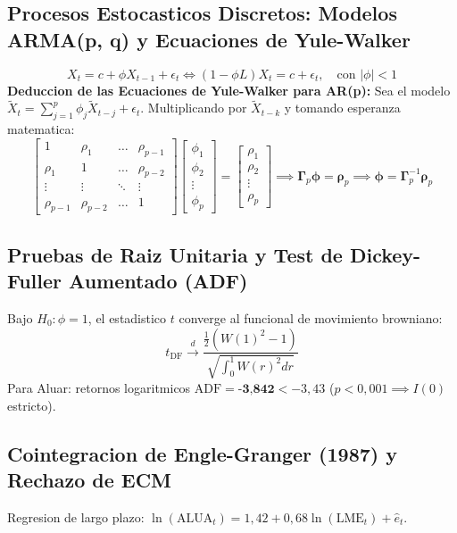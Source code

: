 \documentclass[10pt,a4paper]{article}
\theoremstyle{definition}
\begin{document}
\subsection{Procesos Estocasticos Discretos: Modelos ARMA(p, q) y Ecuaciones de Yule-Walker}
\begin{equation}
X_t = c + \phi X_{t-1} + \epsilon_t \iff (1 - \phi L)X_t = c + \epsilon_t, \quad \text{con } |\phi| < 1
\end{equation}
\textbf{Deduccion de las Ecuaciones de Yule-Walker para AR(p):}
Sea el modelo $\tilde{X}_t = \sum_{j=1}^p \phi_j \tilde{X}_{t-j} + \epsilon_t$. Multiplicando por $\tilde{X}_{t-k}$ y tomando esperanza matematica:
\begin{equation}
\begin{bmatrix}
1 & \rho_1 & \dots & \rho_{p-1} \\
\rho_1 & 1 & \dots & \rho_{p-2} \\
\vdots & \vdots & \ddots & \vdots \\
\rho_{p-1} & \rho_{p-2} & \dots & 1
\end{bmatrix}
\begin{bmatrix}
\phi_1 \\
\phi_2 \\
\vdots \\
\phi_p
\end{bmatrix}
=
\begin{bmatrix}
\rho_1 \\
\rho_2 \\
\vdots \\
\rho_p
\end{bmatrix}
\implies \boldsymbol{\Gamma}_p \boldsymbol{\phi} = \boldsymbol{\rho}_p \implies \boldsymbol{\phi} = \boldsymbol{\Gamma}_p^{-1} \boldsymbol{\rho}_p
\end{equation}

\subsection{Pruebas de Raiz Unitaria y Test de Dickey-Fuller Aumentado (ADF)}
Bajo $H_0: \phi = 1$, el estadistico $t$ converge al funcional de movimiento browniano:
\begin{equation}
t_{\text{DF}} \xrightarrow{d} \frac{\frac{1}{2}\left( W(1)^2 - 1 \right)}{\sqrt{\int_0^1 W(r)^2 dr}}
\end{equation}
Para Aluar: retornos logaritmicos $\text{ADF} = \textbf{-3,842} < -3,43$ ($p < 0,001 \implies I(0)$ estricto).

\subsection{Cointegracion de Engle-Granger (1987) y Rechazo de ECM}
Regresion de largo plazo: $\ln(\text{ALUA}_t) = 1,42 + 0,68 \ln(\text{LME}_t) + \hat{e}_t$.
\end{document}

